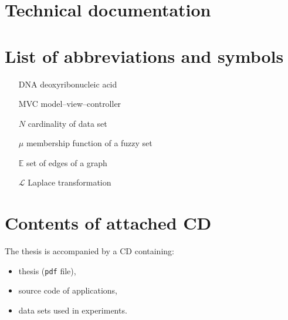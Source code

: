 \documentclass[12pt, twoside, a4paper, openright]{report}
\begin{document}
\begin{appendices}
    \chapter*{Technical documentation}

    \chapter*{List of abbreviations and symbols}

    \begin{itemize}
    \item[DNA] deoxyribonucleic acid
    \item[MVC] model--view--controller 
    \item[$N$] cardinality of data set
    \item[$\mu$] membership function of a fuzzy set
    \item[$\mathbb{E}$] set of edges of a graph
    \item[$\mathcal{L}$] Laplace transformation
    \end{itemize}

    \chapter*{Contents of attached CD}

    The thesis is accompanied by a CD containing:
    \begin{itemize}
    \item thesis (\texttt{pdf} file),
    \item source code of applications,
    \item data sets used in experiments.
    \end{itemize}   
\end{appendices}

\newpage

\listoffigures
\listoftables

\nocite{*}


\end{document}
